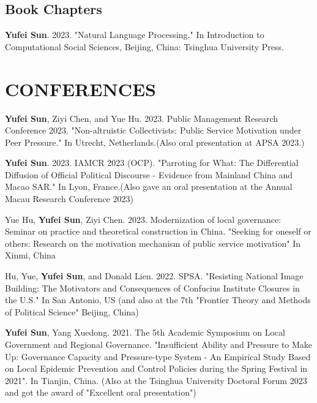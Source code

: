 \documentclass[11pt,a4paper]{article}
\begin{document}
\subsection*{Book Chapters}
\begin{spacing}{1}
\textbf{Yufei Sun}. 2023. "Natural Language Processing." In Introduction to Computational Social Sciences, Beijing, China: Tsinghua University Press.
\end{spacing}

\section*{CONFERENCES}
\begin{spacing}{1}
\textbf{Yufei Sun}, Ziyi Chen, and Yue Hu. 2023. Public Management Research Conference 2023. "Non-altruistic Collectivists: Public Service Motivation under Peer Pressure." In Utrecht, Netherlands.(Also oral presentation at APSA 2023.)
\end{spacing}

\begin{spacing}{1}
\textbf{Yufei Sun}. 2023. IAMCR 2023 (OCP). "Parroting for What: The Differential Diffusion of Official Political Discourse - Evidence from Mainland China and Macao SAR." In Lyon, France.(Also gave an oral presentation at the Annual Macau Research Conference 2023)
\end{spacing}

\begin{spacing}{1}
Yue Hu, \textbf{Yufei Sun}, Ziyi Chen. 2023. Modernization of local governance: Seminar on practice and theoretical construction in China. "Seeking for oneself or others: Research on the motivation mechanism of public service motivation" In Xinmi, China
\end{spacing}

\begin{spacing}{1}
Hu, Yue, \textbf{Yufei Sun}, and Donald Lien. 2022. SPSA. "Resisting National Image Building: The Motivators and Consequences of Confucius Institute Closures in the U.S." In San Antonio, US (and also at the 7th "Frontier Theory and Methods of Political Science" Beijing, China)
\end{spacing}

\begin{spacing}{1}
\textbf{Yufei Sun}, Yang Xuedong. 2021. The 5th Academic Symposium on Local Government and Regional Governance. "Insufficient Ability and Pressure to Make Up: Governance Capacity and Pressure-type System - An Empirical Study Based on Local Epidemic Prevention and Control Policies during the Spring Festival in 2021". In Tianjin, China. (Also at the Tsinghua University Doctoral Forum 2023 and got the award of "Excellent oral presentation")
\end{spacing}
\end{document}

